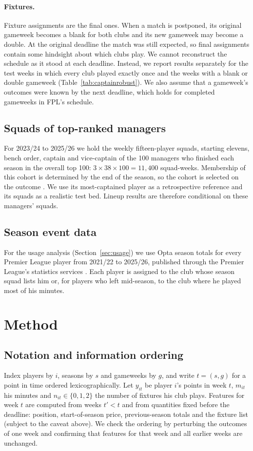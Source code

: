 \documentclass[11pt,a4paper]{article}
\begin{document}
\paragraph{Fixtures.} Fixture assignments are the final ones. When a match is postponed, its
original gameweek becomes a blank for both clubs and its new gameweek may become a double. At the
original deadline the match was still expected, so final assignments contain some hindsight about
which clubs play. We cannot reconstruct the schedule as it stood at each deadline. Instead, we
report results separately for the \nRegularWeeks{} test weeks in which every club played exactly
once and the \nIrregularWeeks{} weeks with a blank or double gameweek
(Table~\ref{tab:captainrobust}). We also assume that a gameweek's outcomes were known by the next
deadline, which holds for completed gameweeks in FPL's schedule.

\subsection{Squads of top-ranked managers}
For 2023/24 to 2025/26 we hold the weekly fifteen-player squads, starting elevens, bench order,
captain and vice-captain of the 100 managers who finished each season in the overall top 100:
$3\times38\times100=11{,}400$ squad-weeks. Membership of this cohort is determined by the end of
the season, so the cohort is selected on the outcome \citep{brown1992}. We use its most-captained
player as a retrospective reference and its squads as a realistic test bed. Lineup results are
therefore conditional on these managers' squads.

\subsection{Season event data}
For the usage analysis (Section~\ref{sec:usage}) we use Opta season totals for every Premier
League player from 2021/22 to 2025/26, published through the Premier League's statistics services
\citep{plstats}. Each player is assigned to the club whose season squad lists him or, for players
who left mid-season, to the club where he played most of his minutes.

\section{Method}

\subsection{Notation and information ordering}
Index players by $i$, seasons by $s$ and gameweeks by $g$, and write $t=(s,g)$ for a point in time
ordered lexicographically. Let $y_{it}$ be player $i$'s points in week $t$, $m_{it}$ his minutes and
$n_{it}\in\{0,1,2\}$ the number of fixtures his club plays. Features for week $t$ are computed from
weeks $t'<t$ and from quantities fixed before the deadline: position, start-of-season price,
previous-season totals and the fixture list (subject to the caveat above). We check the ordering by
perturbing the outcomes of one week and confirming that features for that week and all earlier
weeks are unchanged.
\end{document}
